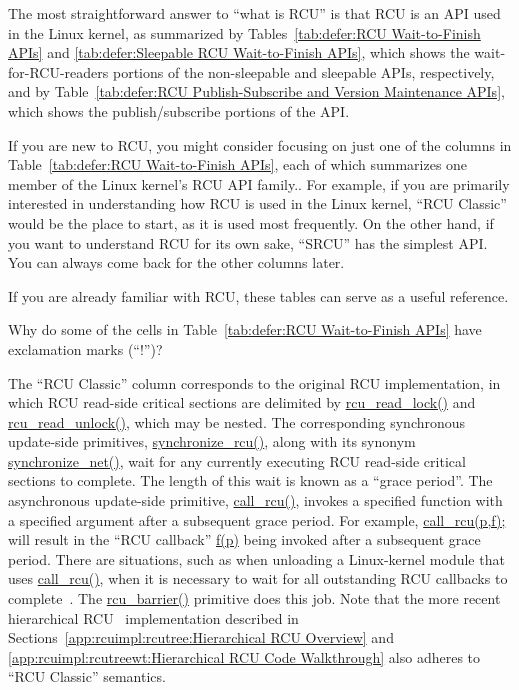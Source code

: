 The most straightforward answer to ``what is RCU'' is that RCU is
an API used in the Linux kernel, as summarized by
Tables~\ref{tab:defer:RCU Wait-to-Finish APIs} and
\ref{tab:defer:Sleepable RCU Wait-to-Finish APIs},
which shows the wait-for-RCU-readers portions of the non-sleepable and
sleepable APIs, respectively,
and by
Table~\ref{tab:defer:RCU Publish-Subscribe and Version Maintenance APIs},
which shows the publish/subscribe portions of the API.

If you are new to RCU, you might consider focusing on just one
of the columns in
Table~\ref{tab:defer:RCU Wait-to-Finish APIs},
each of which summarizes one member of the Linux kernel's RCU API family..
For example, if you are primarily interested in understanding how RCU
is used in the Linux kernel, ``RCU Classic'' would be the place to start,
as it is used most frequently.
On the other hand, if you want to understand RCU for its own sake,
``SRCU'' has the simplest API.
You can always come back for the other columns later.

If you are already familiar with RCU, these tables can
serve as a useful reference.

\QuickQuiz{}
	Why do some of the cells in
	Table~\ref{tab:defer:RCU Wait-to-Finish APIs}
	have exclamation marks (``!'')?
 \QuickQuizEnd

The ``RCU Classic'' column corresponds to the original RCU implementation,
in which RCU read-side critical sections are delimited by
\url{rcu_read_lock()} and \url{rcu_read_unlock()}, which
may be nested.
The corresponding synchronous update-side primitives,
\url{synchronize_rcu()}, along with its synonym
\url{synchronize_net()}, wait for any currently executing
RCU read-side critical sections to complete.
The length of this wait is known as a ``grace period''.
The asynchronous update-side primitive, \url{call_rcu()},
invokes a specified function with a specified argument after a
subsequent grace period.
For example, \url{call_rcu(p,f);} will result in
the ``RCU callback'' \url{f(p)}
being invoked after a subsequent grace period.
There are situations,
such as when unloading a Linux-kernel module that uses \url{call_rcu()},
when it is necessary to wait for all
outstanding RCU callbacks to complete~\cite{PaulEMcKenney2007rcubarrier}.
The \url{rcu_barrier()} primitive does this job.
Note that the more recent hierarchical
RCU~\cite{PaulEMcKenney2008HierarchicalRCU}
implementation described in
Sections~\ref{app:rcuimpl:rcutree:Hierarchical RCU Overview} and
\ref{app:rcuimpl:rcutreewt:Hierarchical RCU Code Walkthrough}
also adheres to ``RCU Classic'' semantics.

